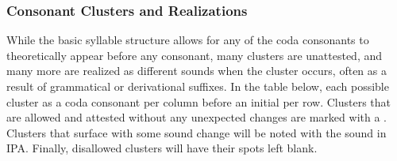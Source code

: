 \subsubsection{Consonant Clusters and Realizations}
While the basic syllable structure allows for any of the coda consonants to theoretically appear before any consonant, many clusters are unattested, and many more are realized as different sounds when the cluster occurs, often as a result of grammatical or derivational suffixes. In the table below, each possible cluster as a coda consonant per column before an initial per row. Clusters that are allowed and attested without any unexpected changes are marked with a \checkmark. Clusters that surface with some sound change will be noted with the sound in IPA. Finally, disallowed clusters will have their spots left blank.\par\vertspace
